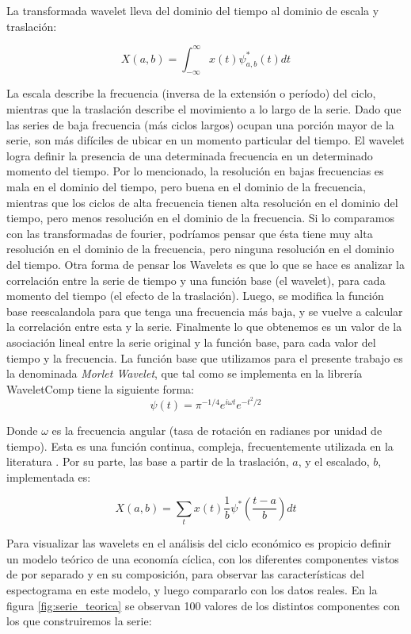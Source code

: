 \documentclass[a4paper]{article}
\begin{document}
La transformada wavelet lleva del dominio del tiempo al dominio de escala y traslación:

$$
X(a,b)=\int_{-\infty}^{\infty} x(t) \psi^*_{a,b}(t)dt
$$

La escala describe la frecuencia (inversa de la extensión o período) del ciclo, mientras que la traslación describe el movimiento a lo largo de la serie. Dado que las series de baja frecuencia (más ciclos largos) ocupan una porción mayor de la serie, son más difíciles de ubicar en un momento particular del tiempo. El wavelet logra definir la presencia de una determinada frecuencia en un determinado momento del tiempo. Por lo mencionado, la resolución en bajas frecuencias es mala en el dominio del tiempo, pero buena en el dominio de la frecuencia, mientras que los ciclos de alta frecuencia tienen alta resolución en el dominio del tiempo, pero menos resolución en el dominio de la frecuencia. Si lo comparamos con las transformadas de fourier, podríamos pensar que ésta tiene muy alta resolución en el dominio de la frecuencia, pero ninguna resolución en el dominio del tiempo. 
Otra forma de pensar los Wavelets es que lo que se hace es analizar la correlación entre la serie de tiempo y una función base (el wavelet), para cada momento del tiempo (el efecto de la traslación). Luego, se modifica la función base reescalandola para que tenga una frecuencia más baja, y se vuelve a calcular la correlación entre esta y la serie. Finalmente lo que obtenemos es un valor de la asociación lineal entre la serie original y la función base, para cada valor del tiempo y la frecuencia.  
La función base que utilizamos para el presente trabajo es la denominada \textit{Morlet Wavelet}, que tal como se implementa en la librería WaveletComp \citep{Roesch2018} tiene la siguiente forma:
$$
\psi(t)=\pi^{-1/4}e^{i\omega t}e^{-t^2/2}
$$

Donde $\omega$ es la frecuencia angular (tasa de rotación en radianes por unidad de tiempo). Esta es una función continua, compleja, frecuentemente utilizada en la literatura \citep{conraria2011continuous}. Por su parte, las base a partir de la traslación, $a$, y el escalado, $b$, implementada es:

$$
X(a,b)=\sum_{t} x(t)   \frac{1}{b} \psi^*(\frac{t-a}{b})dt
$$


Para visualizar las wavelets en el análisis del ciclo económico es propicio definir un modelo teórico de una economía cíclica, con los diferentes componentes vistos de por separado y en su composición, para observar las características del espectograma en este modelo,  y luego compararlo con los datos reales. 
En la figura \ref{fig:serie_teorica} se observan 100 valores de los distintos componentes con los que construiremos la serie:
\end{document}
